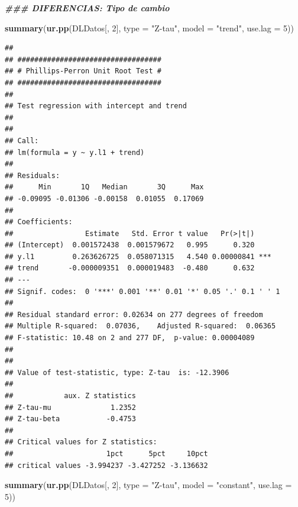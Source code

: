 \documentclass[
]{book}
\newenvironment{Shaded}{\begin{snugshade}}{\end{snugshade}}
\newcommand{\AttributeTok}[1]{\textcolor[rgb]{0.13,0.29,0.53}{#1}}
\newcommand{\DecValTok}[1]{\textcolor[rgb]{0.00,0.00,0.81}{#1}}
\newcommand{\DocumentationTok}[1]{\textcolor[rgb]{0.56,0.35,0.01}{\textbf{\textit{#1}}}}
\newcommand{\FunctionTok}[1]{\textcolor[rgb]{0.13,0.29,0.53}{\textbf{#1}}}
\newcommand{\NormalTok}[1]{#1}
\newcommand{\StringTok}[1]{\textcolor[rgb]{0.31,0.60,0.02}{#1}}
\begin{document}
\begin{Shaded}
\begin{Highlighting}[]
\DocumentationTok{\#\#\# DIFERENCIAS: Tipo de cambio}

\FunctionTok{summary}\NormalTok{(}\FunctionTok{ur.pp}\NormalTok{(DLDatos[, }\DecValTok{2}\NormalTok{], }\AttributeTok{type =} \StringTok{"Z{-}tau"}\NormalTok{, }\AttributeTok{model =} \StringTok{"trend"}\NormalTok{, }\AttributeTok{use.lag =} \DecValTok{5}\NormalTok{))}
\end{Highlighting}
\end{Shaded}

\begin{verbatim}
## 
## ################################## 
## # Phillips-Perron Unit Root Test # 
## ################################## 
## 
## Test regression with intercept and trend 
## 
## 
## Call:
## lm(formula = y ~ y.l1 + trend)
## 
## Residuals:
##      Min       1Q   Median       3Q      Max 
## -0.09095 -0.01306 -0.00158  0.01055  0.17069 
## 
## Coefficients:
##                 Estimate   Std. Error t value   Pr(>|t|)    
## (Intercept)  0.001572438  0.001579672   0.995      0.320    
## y.l1         0.263626725  0.058071315   4.540 0.00000841 ***
## trend       -0.000009351  0.000019483  -0.480      0.632    
## ---
## Signif. codes:  0 '***' 0.001 '**' 0.01 '*' 0.05 '.' 0.1 ' ' 1
## 
## Residual standard error: 0.02634 on 277 degrees of freedom
## Multiple R-squared:  0.07036,    Adjusted R-squared:  0.06365 
## F-statistic: 10.48 on 2 and 277 DF,  p-value: 0.00004089
## 
## 
## Value of test-statistic, type: Z-tau  is: -12.3906 
## 
##            aux. Z statistics
## Z-tau-mu              1.2352
## Z-tau-beta           -0.4753
## 
## Critical values for Z statistics: 
##                      1pct      5pct     10pct
## critical values -3.994237 -3.427252 -3.136632
\end{verbatim}

\begin{Shaded}
\begin{Highlighting}[]
\FunctionTok{summary}\NormalTok{(}\FunctionTok{ur.pp}\NormalTok{(DLDatos[, }\DecValTok{2}\NormalTok{], }\AttributeTok{type =} \StringTok{"Z{-}tau"}\NormalTok{, }\AttributeTok{model =} \StringTok{"constant"}\NormalTok{, }\AttributeTok{use.lag =} \DecValTok{5}\NormalTok{))}
\end{Highlighting}
\end{Shaded}
\end{document}
